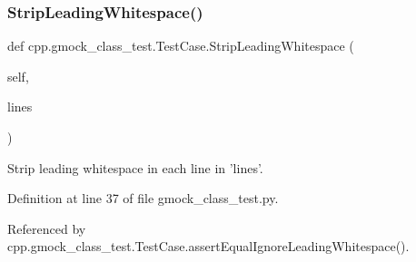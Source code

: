 \mbox{\label{classcpp_1_1gmock__class__test_1_1TestCase_a366b15717eebc41e397357868c5734c5}} 
\subsubsection{\texorpdfstring{Strip\+Leading\+Whitespace()}{StripLeadingWhitespace()}}
{\footnotesize\ttfamily def cpp.\+gmock\+\_\+class\+\_\+test.\+Test\+Case.\+Strip\+Leading\+Whitespace (\begin{DoxyParamCaption}\item[{}]{self,  }\item[{}]{lines }\end{DoxyParamCaption})}

\begin{DoxyVerb}Strip leading whitespace in each line in 'lines'.\end{DoxyVerb}
 

Definition at line 37 of file gmock\+\_\+class\+\_\+test.\+py.



Referenced by cpp.\+gmock\+\_\+class\+\_\+test.\+Test\+Case.\+assert\+Equal\+Ignore\+Leading\+Whitespace().


